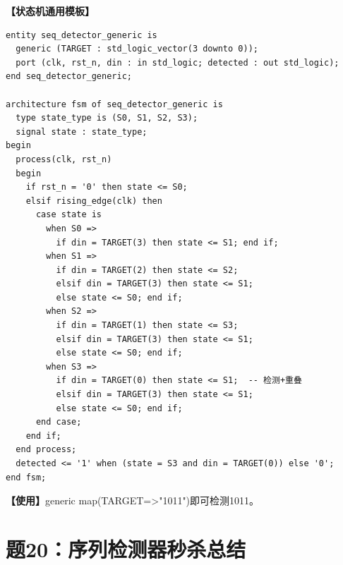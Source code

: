 \begin{solution}[完整解答]

\textbf{【状态机通用模板】}
\begin{lstlisting}
entity seq_detector_generic is
  generic (TARGET : std_logic_vector(3 downto 0));
  port (clk, rst_n, din : in std_logic; detected : out std_logic);
end seq_detector_generic;

architecture fsm of seq_detector_generic is
  type state_type is (S0, S1, S2, S3);
  signal state : state_type;
begin
  process(clk, rst_n)
  begin
    if rst_n = '0' then state <= S0;
    elsif rising_edge(clk) then
      case state is
        when S0 =>
          if din = TARGET(3) then state <= S1; end if;
        when S1 =>
          if din = TARGET(2) then state <= S2;
          elsif din = TARGET(3) then state <= S1;
          else state <= S0; end if;
        when S2 =>
          if din = TARGET(1) then state <= S3;
          elsif din = TARGET(3) then state <= S1;
          else state <= S0; end if;
        when S3 =>
          if din = TARGET(0) then state <= S1;  -- 检测+重叠
          elsif din = TARGET(3) then state <= S1;
          else state <= S0; end if;
      end case;
    end if;
  end process;
  detected <= '1' when (state = S3 and din = TARGET(0)) else '0';
end fsm;
\end{lstlisting}

\textbf{【使用】}generic map(TARGET=>"1011")即可检测1011。

\end{solution}


\section{题20：序列检测器秒杀总结}


